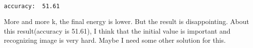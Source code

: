 \documentclass[11pt]{article}
\begin{document}
    \begin{center}
    \end{center}
    { \hspace*{\fill} \\}
    
    \begin{Verbatim}[commandchars=\\\{\}]
accuracy:  51.61

    \end{Verbatim}

    More and more k, the final energy is lower. But the result is
disappointing. About this result(accuracy is 51.61), I think that the
initial value is important and recognizing image is very hard. Maybe I
need some other solution for this.


    
    
    
    
\end{document}
